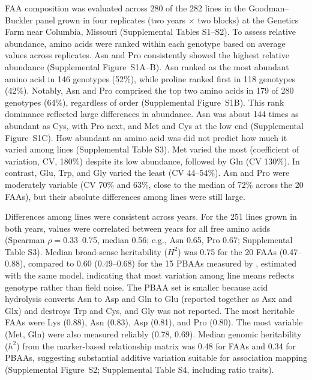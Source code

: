 \documentclass[namedate,unnumsec,webpdf,contemporary,large]{oup-authoring-template}
\begin{document}
FAA composition was evaluated across 280 of the 282 lines in the Goodman--Buckler panel grown in four replicates (two years $\times$ two blocks) at the Genetics Farm near Columbia, Missouri (Supplemental Tables S1--S2). To assess relative abundance, amino acids were ranked within each genotype based on average values across replicates. Asn and Pro consistently showed the highest relative abundance (Supplemental Figure~S1A--B). Asn ranked as the most abundant amino acid in 146 genotypes (52\%), while proline ranked first in 118 genotypes (42\%). Notably, Asn and Pro comprised the top two amino acids in 179 of 280 genotypes (64\%), regardless of order (Supplemental Figure~S1B). This rank dominance reflected large differences in abundance. Asn was about 144 times as abundant as Cys, with Pro next, and Met and Cys at the low end (Supplemental Figure~S1C). How abundant an amino acid was did not predict how much it varied among lines (Supplemental Table S3). Met varied the most (coefficient of variation, CV, 180\%) despite its low abundance, followed by Gln (CV 130\%). In contrast, Glu, Trp, and Gly varied the least (CV 44--54\%). Asn and Pro were moderately variable (CV 70\% and 63\%, close to the median of 72\% across the 20 FAAs), but their absolute differences among lines were still large. %

Differences among lines were consistent across years. For the 251 lines grown in both years, values were correlated between years for all free amino acids (Spearman $\rho = 0.33$--0.75, median 0.56; e.g., Asn 0.65, Pro 0.67; Supplemental Table S3). Median broad-sense heritability ($H^2$) was 0.75 for the 20 FAAs (0.47--0.88), compared to 0.60 (0.49--0.68) for the 15 PBAAs measured by \citet{Shrestha2022}, estimated with the same model, indicating that most variation among line means reflects genotype rather than field noise. The PBAA set is smaller because acid hydrolysis converts Asn to Asp and Gln to Glu (reported together as Asx and Glx) and destroys Trp and Cys, and Gly was not reported. The most heritable FAAs were Lys (0.88), Asn (0.83), Asp (0.81), and Pro (0.80). The most variable (Met, Gln) were also measured reliably (0.78, 0.69). Median genomic heritability ($h^2$) from the marker-based relationship matrix was 0.48 for FAAs and 0.34 for PBAAs, suggesting substantial additive variation suitable for association mapping (Supplemental Figure~S2; Supplemental Table S4, including ratio traits).
\end{document}

